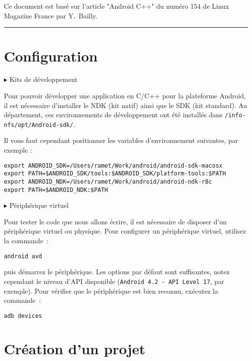 \documentclass[a4paper]{article}
\theoremstyle{break}
\begin{document}
\date{\today}

Ce document est basé sur l'article "Android C++" du numéro 154 de Linux Magazine
France par Y.~Bailly.

\medskip
\hrule
\medskip

\section{Configuration}

    $\blacktriangleright$ Kits de développement

Pour pouvoir développer une application en C/C++ pour la plateforme
Android, il est nécessaire d'installer le NDK (kit natif) ainsi que le
SDK (kit standard). 
Au département, ces environnements de développement ont été installés
dans {\tt /info-nfs/opt/Android-sdk/}.

Il vous faut cependant positionner les variables d'environnement
suivantes, par exemple :

\begin{verbatim}
export ANDROID_SDK=/Users/ramet/Work/android/android-sdk-macosx
export PATH=$ANDROID_SDK/tools:$ANDROID_SDK/platform-tools:$PATH
export ANDROID_NDK=/Users/ramet/Work/android/android-ndk-r8c
export PATH=$ANDROID_NDK:$PATH
\end{verbatim}

    $\blacktriangleright$ Périphérique virtuel

Pour tester le code que nous allons écrire, il est nécessaire de
disposer d'un périphérique virtuel ou physique.
Pour configurer un périphérique virtuel, utilisez la commande~:

\begin{verbatim}
android avd
\end{verbatim}

puis démarrez le périphérique. Les options par défaut sont
suffisantes, notez cependant le niveau d'API disponible 
({\tt Android 4.2 - API Level 17}, par exemple). 
Pour vérifier que le périphérique est bien reconnu, exécutez la commande~:

\begin{verbatim}
adb devices
\end{verbatim}

\section{Création d'un projet}
\end{document}
